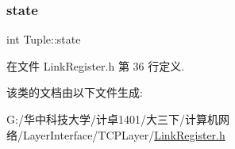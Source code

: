 \subsubsection{\texorpdfstring{state}{state}}
{\footnotesize\ttfamily int Tuple\+::state}



在文件 Link\+Register.\+h 第 36 行定义.



该类的文档由以下文件生成\+:\begin{DoxyCompactItemize}
\item 
G\+:/华中科技大学/计卓1401/大三下/计算机网络/\+Layer\+Interface/\+T\+C\+P\+Layer/\hyperlink{_link_register_8h}{Link\+Register.\+h}\end{DoxyCompactItemize}
